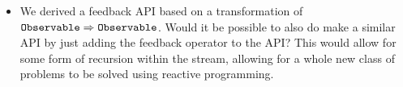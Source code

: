 \begin{itemize}
\begin{itemize}
		\item We derived a feedback API based on a transformation of $\texttt{Observable} \Rightarrow \texttt{Observable}$. Would it be possible to also do make a similar API by just adding the feedback operator to the \obs API? This would allow for some form of recursion within the stream, allowing for a whole new class of problems to be solved using reactive programming.
	\end{itemize}
\end{itemize}
